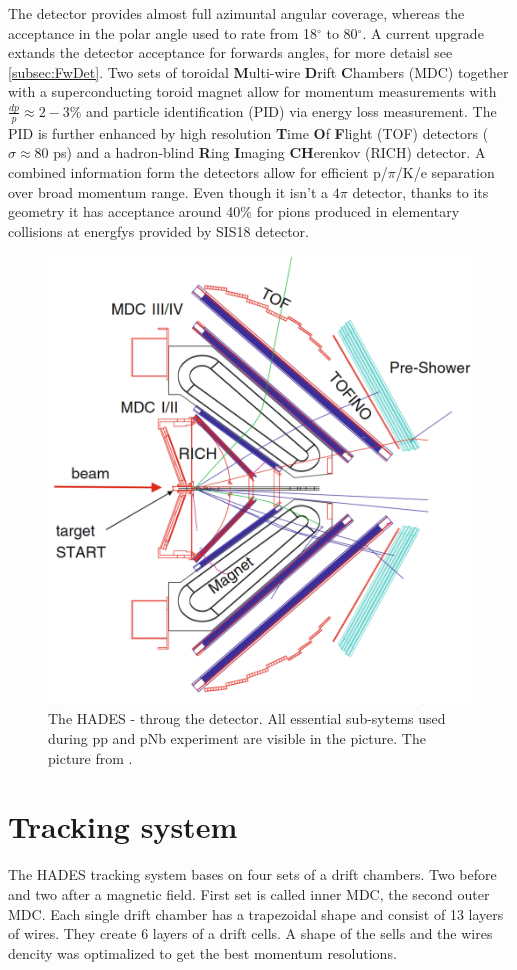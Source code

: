 The detector provides almost full azimuntal angular coverage, whereas the acceptance in the polar angle used to rate from 18$^{\circ}$  to 80$^{\circ}$. A current upgrade extands the detector acceptance for forwards angles, for more detaisl see \ref{subsec:FwDet}. Two sets of toroidal \textbf{M}ulti-wire \textbf{D}rift \textbf{C}hambers (MDC) together with a superconducting toroid magnet allow for momentum measurements with $\frac{dp}{p} \approx 2-3\%$ and particle identification (PID) via energy loss measurement. The PID is further enhanced by high resolution \textbf{T}ime \textbf{O}f \textbf{F}light (TOF) detectors ($\sigma \approx 80$ ps) and a hadron-blind \textbf{R}ing \textbf{I}maging \textbf{CH}erenkov (RICH) detector. A combined information form the detectors allow for efficient p/$\pi$/K/e separation over broad momentum range. Even though it isn't a $4 \pi$ detector, thanks to its geometry it has acceptance around 40\% for pions produced in elementary collisions at energfys provided by SIS18 detector.
\begin{figure}
  \centering
  \includegraphics[width=0.7 \linewidth]{Chapter_detector/detektor.eps}
  \caption{The HADES - \cs throug the detector. All essential sub-sytems used during pp and pNb experiment are visible in the picture. The picture from \cite{Agakishiev:2009am}.}
\end{figure}

\section{Tracking system}
The HADES tracking system bases on four sets of a drift chambers. Two before and two after a magnetic field. First set is called inner MDC, the second outer MDC. Each single drift chamber has a trapezoidal shape and consist of 13 layers of wires. They create 6 layers of a drift cells. A shape of the sells and the wires dencity was optimalized to get the best momentum resolutions.

